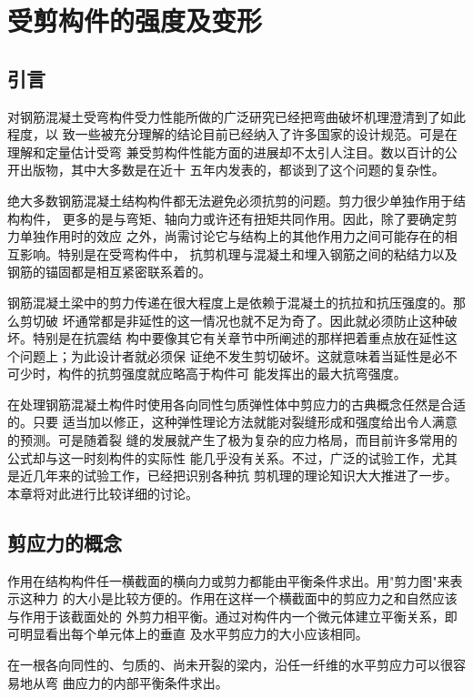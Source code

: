 \documentclass[12pt,a4paper]{book}
\begin{document}
\chapter{受剪构件的强度及变形}

\section{引言}

对钢筋混凝土受弯构件受力性能所做的广泛研究已经把弯曲破坏机理澄清到了如此程度，以
致一些被充分理解的结论目前已经纳入了许多国家的设计规范。可是在理解和定量估计受弯
兼受剪构件性能方面的进展却不太引人注目。数以百计的公开出版物，其中大多数是在近十
五年内发表的，都谈到了这个问题的复杂性。

绝大多数钢筋混凝土结构构件都无法避免必须抗剪的问题。剪力很少单独作用于结构构件，
更多的是与弯矩、轴向力或许还有扭矩共同作用。因此，除了要确定剪力单独作用时的效应
之外，尚需讨论它与结构上的其他作用力之间可能存在的相互影响。特别是在受弯构件中，
抗剪机理与混凝土和埋入钢筋之间的粘结力以及钢筋的锚固都是相互紧密联系着的。

钢筋混凝土梁中的剪力传递在很大程度上是依赖于混凝土的抗拉和抗压强度的。那么剪切破
坏通常都是非延性的这一情况也就不足为奇了。因此就必须防止这种破坏。特别是在抗震结
构中要像其它有关章节中所阐述的那样把着重点放在延性这个问题上；为此设计者就必须保
证绝不发生剪切破坏。这就意味着当延性是必不可少时，构件的抗剪强度就应略高于构件可
能发挥出的最大抗弯强度。

在处理钢筋混凝土构件时使用各向同性匀质弹性体中剪应力的古典概念任然是合适的。只要
适当加以修正，这种弹性理论方法就能对裂缝形成和强度给出令人满意的预测。可是随着裂
缝的发展就产生了极为复杂的应力格局，而目前许多常用的公式却与这一时刻构件的实际性
能几乎没有关系。不过，广泛的试验工作，尤其是近几年来的试验工作，已经把识别各种抗
剪机理的理论知识大大推进了一步。本章将对此进行比较详细的讨论。

\section{剪应力的概念}

作用在结构构件任一横截面的横向力或剪力都能由平衡条件求出。用"剪力图"来表示这种力
的大小是比较方便的。作用在这样一个横截面中的剪应力之和自然应该与作用于该截面处的
外剪力相平衡。通过对构件内一个微元体建立平衡关系，即可明显看出每个单元体上的垂直
及水平剪应力的大小应该相同。

在一根各向同性的、匀质的、尚未开裂的梁内，沿任一纤维的水平剪应力可以很容易地从弯
曲应力的内部平衡条件求出。
\end{document}
